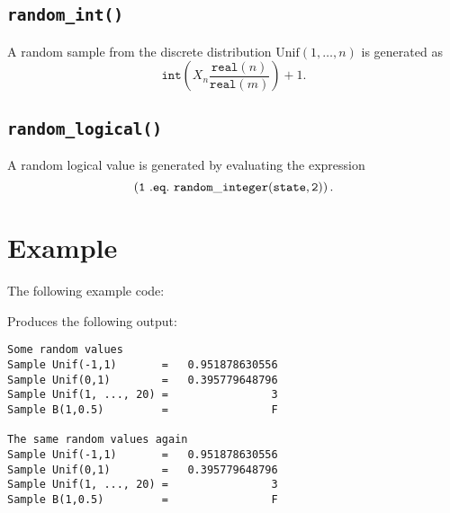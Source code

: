 \subsection{\tt random\_int()}
A random sample from the discrete distribution $\mathrm{Unif}(1, \ldots, n)$ is
generated as
$$
   \texttt{int}\left( X_n \frac{\texttt{real}(n)}{\texttt{real}(m)} \right) + 1.
$$

\subsection{\tt random\_logical()}
A random logical value is generated by evaluating the expression
$$
\tt \left(1\ .eq.\ random\_integer(state, 2)\right).
$$



\section{Example} \label{examples}

The following example code:

Produces the following output:
\begin{verbatim}
Some random values
Sample Unif(-1,1)       =   0.951878630556
Sample Unif(0,1)        =   0.395779648796
Sample Unif(1, ..., 20) =                3
Sample B(1,0.5)         =                F

The same random values again
Sample Unif(-1,1)       =   0.951878630556
Sample Unif(0,1)        =   0.395779648796
Sample Unif(1, ..., 20) =                3
Sample B(1,0.5)         =                F
\end{verbatim}
